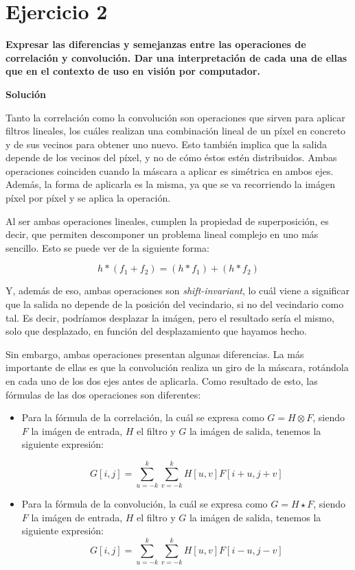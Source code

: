 \documentclass[11pt,a4paper]{article}
\newcommand{\answer}{\noindent\textbf{Solución}}
\newcommand{\question}[1]{\noindent\textbf{#1}}
\newcommand{\nonumbersection}[1]{\section*{#1}\addcontentsline{toc}{section}{#1}}
\begin{document}
\nonumbersection{Ejercicio 2}

\question{Expresar las diferencias y semejanzas entre las operaciones de correlación y convolución. Dar una interpretación de
cada una de ellas que en el contexto de uso en visión por computador.}

\answer

Tanto la correlación como la convolución son operaciones que sirven para aplicar filtros lineales, los cuáles realizan
una combinación lineal de un píxel en concreto y de sus vecinos para obtener uno nuevo. Esto también implica que la salida
depende de los vecinos del píxel, y no de cómo éstos estén distribuidos. Ambas operaciones coinciden cuando la máscara
a aplicar es simétrica en ambos ejes. Además, la forma de aplicarla es la misma, ya que se va recorriendo la imágen píxel
por píxel y se aplica la operación.

Al ser ambas operaciones lineales, cumplen la propiedad de superposición, es decir, que permiten descomponer un problema
lineal complejo en uno más sencillo. Esto se puede ver de la siguiente forma:

\begin{equation}
\label{eq:superposition}
h * (f_1 + f_2) = (h * f_1) + (h * f_2)
\end{equation}

Y, además de eso, ambas operaciones son \textit{shift-invariant}, lo cuál viene a significar que la salida no depende de la
posición del vecindario, si no del vecindario como tal. Es decir, podríamos desplazar la imágen, pero el resultado sería
el mismo, solo que desplazado, en función del desplazamiento que hayamos hecho.

Sin embargo, ambas operaciones presentan algunas diferencias. La más importante de ellas es que la convolución realiza
un giro de la máscara, rotándola en cada uno de los dos ejes antes de aplicarla. Como resultado de esto, las fórmulas
de las dos operaciones son diferentes:

\begin{itemize}
	\item Para la fórmula de la correlación, la cuál se expresa como $G = H \otimes F$, siendo $F$ la imágen de entrada,
	$H$ el filtro y $G$ la imágen de salida, tenemos la siguiente expresión:
	
	\begin{equation}
		G[i, j] = \sum_{u=-k}^{k}\sum_{v=-k}^{k}H[u,v]F[i+u, j+v]
	\end{equation}
	
	\item Para la fórmula de la convolución, la cuál se expresa como $G = H \star F$, siendo $F$ la imágen de entrada,
	$H$ el filtro y $G$ la imágen de salida, tenemos la siguiente expresión:
	\begin{equation}
		G[i, j] = \sum_{u=-k}^{k}\sum_{v=-k}^{k}H[u,v]F[i-u, j-v]
	\end{equation}
\end{itemize}
\end{document}
